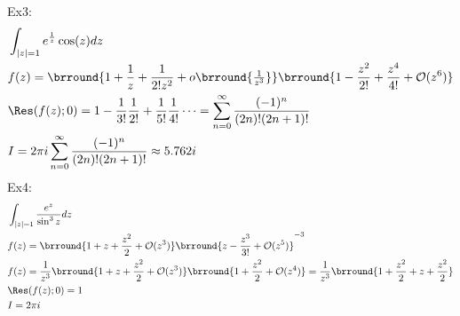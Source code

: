 Ex3:
\begin{align*}
    &\int_{|z|=1}e^{\frac{1}{z}}\cos(z)dz\\
    &f(z)=\brround{1+\frac{1}{z}+\frac{1}{2!z^2}+o\brround{\tfrac{1}{z^3}}}\brround{1-\frac{z^2}{2!}+\frac{z^4}{4!}+\bigO(z^6)}\\
    &\Res(f(z);0)=1-\frac{1}{3!}\frac{1}{2!}+\frac{1}{5!}\frac{1}{4!}\cdots=\sum_{n=0}^\infty\frac{(-1)^n}{(2n)!(2n+1)!}\\
    &I=2\pi i\sum_{n=0}^\infty\frac{(-1)^n}{(2n)!(2n+1)!}\approx 5.762i
\end{align*}
Ex4:
\begin{align*}
    &\int_{|z|=1}\frac{e^z}{\sin^3z}dz\\
    &f(z)=\brround{1+z+\frac{z^2}{2}+\bigO(z^3)}\brround{z-\frac{z^3}{3!}+\bigO(z^5)}^{-3}\\
    &f(z)=\frac{1}{z^3}\brround{1+z+\frac{z^2}{2}+\bigO(z^3)}\brround{1+\frac{z^2}{2}+\bigO(z^4)}=\frac{1}{z^3}\brround{1+\frac{z^2}{2}+z+\frac{z^2}{2}}\\
    &\Res(f(z);0)=1\\
    &I=2\pi i
\end{align*}
